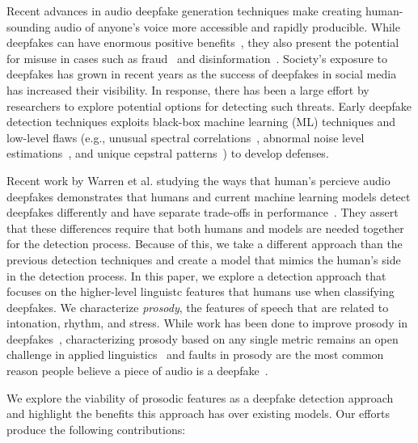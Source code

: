 \documentclass[10pt, journal, anonymous=true]{IEEEtran}
\begin{document}
Recent advances in audio deepfake generation techniques make creating human-sounding audio of anyone's voice more accessible and rapidly producible. While deepfakes can have enormous positive benefits~\cite{MBP14,leviathan_2018_google}, they also present the potential for misuse in cases such as fraud~\cite{FC23,JH23} and disinformation~\cite{SM23,VO23}. Society's exposure to deepfakes has grown in recent years as the success of deepfakes in social media has increased their visibility. In response, there has been a large effort by researchers to explore potential options for detecting such threats. Early deepfake detection techniques exploits black-box
machine learning (ML) techniques and low-level flaws (e.g., unusual spectral correlations~\cite{ALF19}, abnormal noise level estimations~\cite{pan2012detecting}, and unique cepstral patterns~\cite{balamurali2019toward}) to develop defenses. 

Recent work by Warren et al. studying the ways that human's percieve audio deepfakes demonstrates that humans and current machine learning models detect deepfakes differently and have separate trade-offs in performance~\cite{WTC_24}. They assert that these differences require that both humans and models are needed together for the detection process. Because of this, we take a different approach than the previous detection techniques and create a model that mimics the human's side in the detection process. In this paper, we explore a detection approach that focuses on the higher-level linguistc features that humans use when classifying deepfakes. We characterize {\it prosody}, the features of speech that are related to intonation, rhythm, and stress. While work has been done to improve prosody in deepfakes~\cite{sun_generating_2020, sun_fully-hierarchical_2020, skerry-ryan_towards_nodate, karlapati_prosodic_2021, hodari_camp_2021,chen_speech_2021, zhang_learning_2020,yang_exploiting_2020, fu_bi-level_2021, hono_hierarchical_2020, lancucki_fastpitch_2021, aggarwal_using_2020, valle_flowtron_2020}, characterizing prosody based on any single metric remains an open challenge in applied linguistics~\cite{SJP09} and faults in prosody are the most common reason people believe a piece of audio is a deepfake~\cite{WTC_24}. 

We explore the viability of prosodic features as a deepfake detection approach and highlight the benefits this approach has over existing models. Our efforts produce the following contributions:
\end{document}
